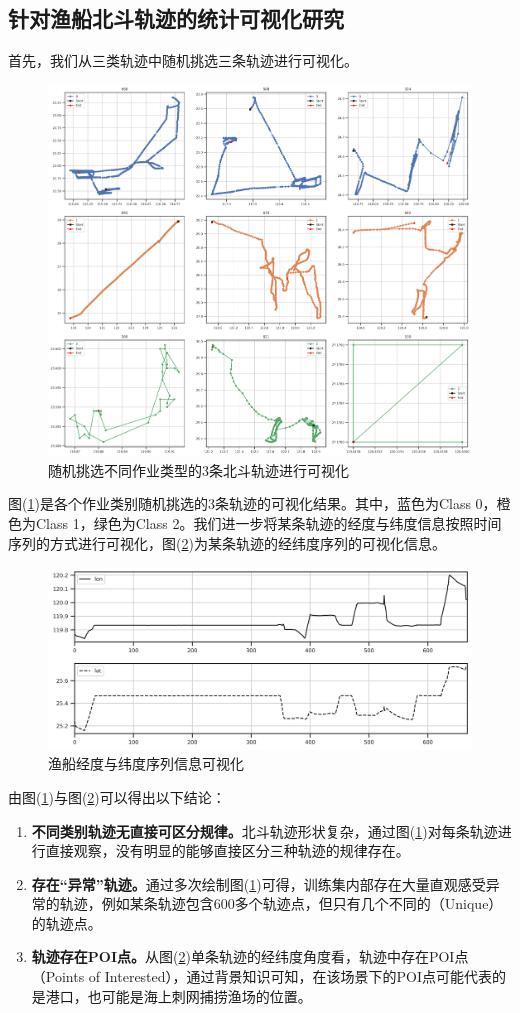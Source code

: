 \documentclass[UTF8, 12pt]{ctexart}
\begin{document}
	\subsection{针对渔船北斗轨迹的统计可视化研究}
	首先，我们从三类轨迹中随机挑选三条轨迹进行可视化。
	\begin{figure}[H]
		\centering
		\includegraphics[width=0.8\linewidth]{..//plots//traj_randomly_9_traj.png}
		\caption{随机挑选不同作业类型的3条北斗轨迹进行可视化}
		\label{sec_1_fig_0}
		\vspace{-0.2cm}
	\end{figure}
	图(\ref{sec_1_fig_0})是各个作业类别随机挑选的3条轨迹的可视化结果。其中，蓝色为Class 0，橙色为Class 1，绿色为Class 2。我们进一步将某条轨迹的经度与纬度信息按照时间序列的方式进行可视化，图(\ref{sec_1_fig_1})为某条轨迹的经纬度序列的可视化信息。
	\begin{figure}[H]
		\centering
		\includegraphics[width=0.7\linewidth]{..//plots//traj_lon_lat_sequence.png}
		\caption{渔船经度与纬度序列信息可视化}
		\label{sec_1_fig_1}
		\vspace{-0.2cm}
	\end{figure}
	由图(\ref{sec_1_fig_0})与图(\ref{sec_1_fig_1})可以得出以下结论：
	\begin{enumerate}
		\item \textbf{不同类别轨迹无直接可区分规律。}北斗轨迹形状复杂，通过图(\ref{sec_1_fig_0})对每条轨迹进行直接观察，没有明显的能够直接区分三种轨迹的规律存在。 
		\item \textbf{存在“异常”轨迹。}通过多次绘制图(\ref{sec_1_fig_0})可得，训练集内部存在大量直观感受异常的轨迹，例如某条轨迹包含600多个轨迹点，但只有几个不同的（Unique）的轨迹点。
		\item \textbf{轨迹存在POI点。}从图(\ref{sec_1_fig_1})单条轨迹的经纬度角度看，轨迹中存在POI点（Points of Interested），通过背景知识可知，在该场景下的POI点可能代表的是港口，也可能是海上刺网捕捞渔场的位置。
	\end{enumerate}
\end{document}

